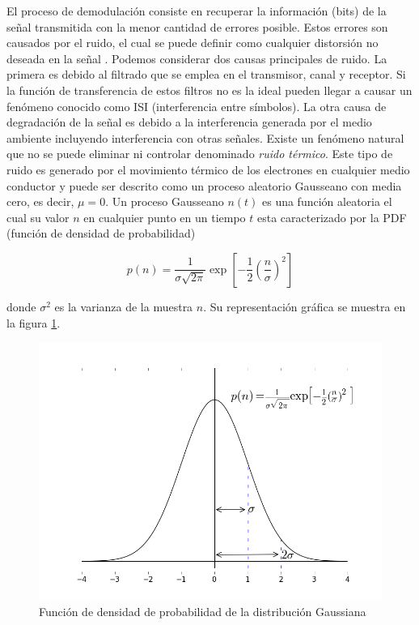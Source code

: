 El proceso de demodulaci\'on consiste en recuperar la informaci\'on (bits) de la se\~nal
transmitida con la menor cantidad de errores posible. Estos errores son causados por el ruido, el
cual se puede definir como cualquier distorsi\'on no deseada en la se\~nal \cite{sklar}. Podemos considerar dos
causas principales de ruido. La primera es debido al filtrado que se emplea en el transmisor, canal
y receptor. Si la funci\'on de transferencia de estos filtros no es la ideal pueden llegar a causar
un fen\'omeno conocido como ISI (interferencia entre s\'imbolos). La otra causa de degradaci\'on de
la se\~nal es debido a la interferencia generada por el medio ambiente incluyendo interferencia con
otras se\~nales. Existe un fen\'omeno natural que no se puede eliminar ni controlar denominado
\emph{ruido t\'ermico}. Este tipo de ruido es generado por el movimiento t\'ermico de los electrones
en cualquier medio conductor y puede ser descrito como un proceso aleatorio Gausseano con media cero, es decir, $\mu=0$. Un
proceso Gausseano $n(t)$ es una funci\'on aleatoria el cual su valor $n$ en cualquier punto en un tiempo $t$ esta
caracterizado por la PDF (funci\'on de densidad de probabilidad)

\begin{equation}\label{eq:gauss}
p(n)=\frac{1}{\sigma\sqrt{2\pi}}\exp\left[-\frac{1}{2}\left(\frac{n}{\sigma}\right)^2\right]
\end{equation}

donde $\sigma^2$ es la varianza de la muestra $n$. Su representaci\'on gr\'afica se muestra en la figura \ref{fig:gauss}.

\begin{figure}[ht]
\centering
	\includegraphics[width=5.5in]{figs/gauss}
	\caption{Funci\'on de densidad de probabilidad de la distribuci\'on Gaussiana \protect\cite{sklar}}
	\label{fig:gauss}
\end{figure}

